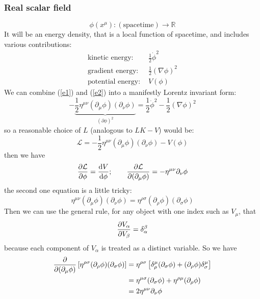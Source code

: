 \subsubsection{Real scalar field}
    \begin{equation*}
        \phi(x^\mu): (\text{spacetime})\to \mathbb{R}
    \end{equation*}
    It will be an energy density, that is a local function of spacetime, and includes various contributions:
    \begin{align}
        \label{e1}\text{kinetic energy: } &\frac{1}{2}\dot{\phi}^2\\
        \label{e2}\text{gradient energy: } &\frac{1}{2}(\nabla \phi)^2\\
        \label{e3}\text{potential energy: } &V(\phi)
    \end{align}
    We can combine (\ref{e1}) and (\ref{e2}) into a manifestly Lorentz invariant form:
    \begin{equation}\label{1eq:148}
        -\underbrace{\frac{1}{2}\eta^{\mu\nu}(\partial_\mu \phi)(\partial_\nu\phi)}_{(\partial\phi)^2}=\frac{1}{2}\dot{\phi}^2-\frac{1}{2}(\nabla\phi)^2
    \end{equation}
    so a reasonable choice of $L$ (analogous to $LK-V$) would be:
    \begin{equation*}
        \mathcal{L}=-\frac{1}{2}\eta^{\mu\nu}(\partial_\mu \phi)(\partial_\nu\phi)-V(\phi)
    \end{equation*}
    then we have
    \begin{equation}\label{1eq:ele-ex}
        \pdv{\mathcal{L}}{\phi}=\dv{V}{\phi};\qquad \pdv{\mathcal{L}}{(\partial_\mu \phi)}=-\eta^{\mu\nu}\partial_\nu\phi
    \end{equation}
    the second one equation is a little tricky:
    \begin{equation*}
        \eta^{\mu\nu}(\partial_\mu \phi)(\partial_\nu\phi)=\eta^{\rho\sigma}(\partial_\rho \phi)(\partial_\sigma\phi)
    \end{equation*}
    Then we can use the general rule, for any object with one index such as $V_\mu$, that
    \begin{equation*}
        \pdv{V_\alpha}{V_\beta}=\delta^\beta_\alpha
    \end{equation*}
    because each component of $V_\alpha$ is treated as a distinct variable. So we have
    \begin{align*}
        \pdv{(\partial_\mu\phi)}\left[\eta^{\rho\sigma}(\partial_\rho \phi)(\partial_\sigma\phi)\right]&=\eta^{\rho\sigma}\left[\delta^\mu_\rho(\partial_\sigma\phi)+(\partial_\rho\phi)\delta^\mu_\sigma\right]\\
        &=\eta^{\mu\sigma}(\partial_\sigma\phi)+\eta^{\rho\mu}(\partial_\rho\phi)\\
        &=2\eta^{\mu\nu}\partial_\nu\phi
    \end{align*}
